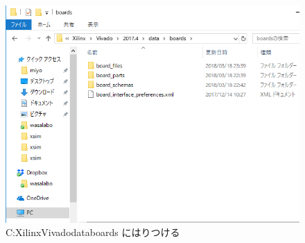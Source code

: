 \documentclass[a4paper,dvipdfmx]{jsarticle}
\begin{document}
 \begin{figure}[H]
  \begin{center}
   \includegraphics[width=.6\textwidth]{appendix_figures/22_dest_folder.png}
  \end{center}
  \caption{ C:\yen Xilinx\yen Vivado\yen data\yen boards にはりつける}
 \end{figure}
\end{document}
